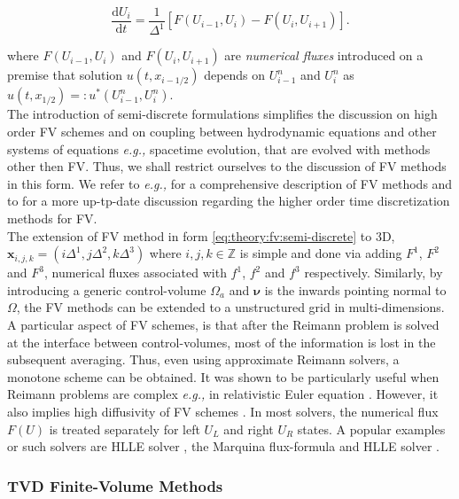 \documentclass[11pt,a4paper,headinclude=true,DIV=14,BCOR=8mm,chapterprefix,listof=totoc,twoside,openright,abstracton]{scrbook}
\begin{document}
\begin{equation}
\frac{\text{d}U_i}{\text{d} t} = \frac{1}{\Delta^1}[F(U_{i-1}, U_{i}) - F(U_i, U_{i+1})].
\label{eq:theory:fv:semi-discrete}
\end{equation}

where $F(U_{i-1}, U_{i})$ and $F(U_i, U_{i+1})$ are \textit{numerical fluxes} introduced on a premise that solution $u(t, x_{i-1/2})$ depends on $U_{i-1} ^n$ and $U_{i} ^n$ as $u(t, x_{1/2}) =: u^* (U_{i-1}^{n}, U_{i}^n)$. \\

The introduction of semi-discrete formulations simplifies the discussion on high order FV schemes and on coupling between hydrodynamic equations and other systems of equations \textit{e.g.,} spacetime evolution, that are evolved with methods other then FV. Thus, we shall restrict ourselves to the discussion of FV methods in this form. We refer to \textit{e.g.,} \cite{Toro:1999} for a comprehensive description of FV methods and to \cite{Gassner:2011} for a more up-tp-date discussion regarding the higher order time discretization methods for FV. \\

The extension of FV method in form \ref{eq:theory:fv:semi-discrete} to 3D,  $\boldsymbol{x}_{i,j,k} = (i\Delta^1,j\Delta^2,k\Delta^3)$ where $i, j, k \in \mathbb{Z}$ is simple and done via adding $F^1$, $F^2$ and $F^3$, numerical fluxes associated with $f^1$, $f^2$ and $f^3$ respectively. Similarly, by introducing a generic control-volume $\Omega_a$ and $\boldsymbol{\nu}$ is the inwards pointing normal to $\Omega$, the FV methods can be extended to a unstructured grid in multi-dimensions. \\ 

A particular aspect of FV schemes, is that after the Reimann problem is solved at the interface between control-volumes, most of the information is lost in the subsequent averaging. Thus, even using approximate Reimann solvers, a monotone scheme can be obtained. It was shown to be particularly useful when Reimann problems are complex \textit{e.g.,} in relativistic Euler equation \cite{Marti:1994,Pons:2000,Giacomazzo:2005jy}. However, it also implies high diffusivity of FV schemes \cite{Harten:1983}. In most solvers, the numerical flux $F(U)$ is treated separately for left $U_L$ and right $U_R$ states. A popular examples or such solvers are HLLE solver \cite{Roe:1981}, the Marquina flux-formula \cite{Donat:1996} and HLLE solver \cite{Einfeldt:1988}. 

\subsubsection{TVD Finite-Volume Methods}
\end{document}
